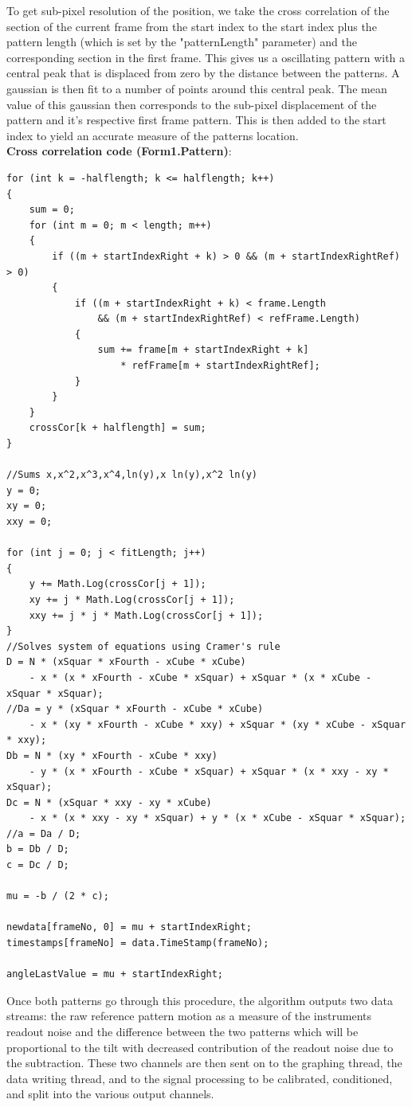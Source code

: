 \documentclass{article}
\begin{document}
To get sub-pixel resolution of the position, we take the cross correlation of the section of the current frame from the start index to the start index plus the pattern length (which is set by the "patternLength" parameter) and the corresponding section in the first frame. This gives us a oscillating pattern with a central peak that is displaced from zero by the distance between the patterns. A gaussian is then fit to a number of points around this central peak. The mean value of this gaussian then corresponds to the sub-pixel displacement of the pattern and it's respective first frame pattern. This is then added to the start index to yield an accurate measure of the patterns location.\\

\textbf{Cross correlation code (Form1.Pattern)}:
\begin{lstlisting}  
for (int k = -halflength; k <= halflength; k++)
{
	sum = 0;
	for (int m = 0; m < length; m++)
	{
		if ((m + startIndexRight + k) > 0 && (m + startIndexRightRef) > 0)
		{
			if ((m + startIndexRight + k) < frame.Length 
				&& (m + startIndexRightRef) < refFrame.Length)
			{
				sum += frame[m + startIndexRight + k] 
					* refFrame[m + startIndexRightRef];
			}
		}
	}
	crossCor[k + halflength] = sum;
}

//Sums x,x^2,x^3,x^4,ln(y),x ln(y),x^2 ln(y)
y = 0;
xy = 0;
xxy = 0;

for (int j = 0; j < fitLength; j++)
{
	y += Math.Log(crossCor[j + 1]);
	xy += j * Math.Log(crossCor[j + 1]);
	xxy += j * j * Math.Log(crossCor[j + 1]);
}
//Solves system of equations using Cramer's rule
D = N * (xSquar * xFourth - xCube * xCube) 
	- x * (x * xFourth - xCube * xSquar) + xSquar * (x * xCube - xSquar * xSquar);
//Da = y * (xSquar * xFourth - xCube * xCube) 
	- x * (xy * xFourth - xCube * xxy) + xSquar * (xy * xCube - xSquar * xxy);
Db = N * (xy * xFourth - xCube * xxy) 
	- y * (x * xFourth - xCube * xSquar) + xSquar * (x * xxy - xy * xSquar);
Dc = N * (xSquar * xxy - xy * xCube) 
	- x * (x * xxy - xy * xSquar) + y * (x * xCube - xSquar * xSquar);
//a = Da / D;
b = Db / D;
c = Dc / D;

mu = -b / (2 * c);

newdata[frameNo, 0] = mu + startIndexRight;
timestamps[frameNo] = data.TimeStamp(frameNo);

angleLastValue = mu + startIndexRight;

\end{lstlisting}

Once both patterns go through this procedure, the algorithm outputs two data streams: the raw reference pattern motion as a measure of the instruments readout noise and the difference between the two patterns which will be proportional to the tilt with decreased contribution of the readout noise due to the subtraction. These two channels are then sent on to the graphing thread, the data writing thread, and to the signal processing to be calibrated, conditioned, and split into the various output channels.
\end{document}

